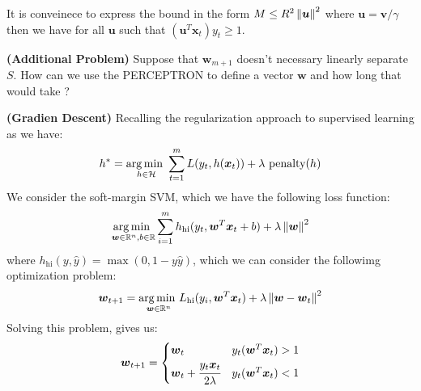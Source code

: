 \begin{remark}
    It is conveinece to express the bound in the form $M \le R^2\left\lVert\boldsymbol u\right\rVert^2$ where $\boldsymbol u = \boldsymbol v/\gamma$ then we have for all $\boldsymbol u$ such that $(\boldsymbol u^T\boldsymbol x_t)y_t\ge1$.     
\end{remark}

\begin{remark}{\textbf{(Additional Problem)}}
    Suppose that $\boldsymbol w_{m+1}$ doesn't necessary linearly separate $S$. How can we use the PERCEPTRON to define a vector $\boldsymbol w$ and how long that would take ? 
\end{remark}

\begin{remark}{\textbf{(Gradien Descent)}}
    Recalling the regularization approach to supervised learning as we have:
    \begin{equation*}
        h^* = \underset{h\in\mathcal{H}}{\arg\min \ } \sum^m_{t=1}L(y_t, h(\boldsymbol x_t)) + \lambda \ \text{penalty}(h)
    \end{equation*}
    We consider the soft-margin SVM, which we have the following loss function:
    \begin{equation*}
        \underset{\boldsymbol w\in \mathbb{R}^n, b\in \mathbb{R}}{\arg\min \ }\sum^m_{i=1}h_\text{hi}(y_t, \boldsymbol w^T\boldsymbol x_t + b) + \lambda\left\lVert\boldsymbol w\right\rVert^2
    \end{equation*}
    where $h_\text{hi}(y, \hat{y}) = \max(0, 1-y\hat{y})$, which we can consider the followimg optimization problem:
    \begin{equation*}
        \boldsymbol w_{t+1} = \underset{\boldsymbol w\in \mathbb{R}^n}{\arg\min \ }L_\text{hi}(y_i, \boldsymbol w^T\boldsymbol x_t) + \lambda\left\lVert\boldsymbol w - \boldsymbol w_t\right\rVert^2
    \end{equation*}
    Solving this problem, gives us:
    \begin{equation*}
        \boldsymbol w_{t+1} = \begin{cases}
            \boldsymbol w_t & y_t(\boldsymbol w^T\boldsymbol x_t) > 1 \\
            \boldsymbol w_t + \cfrac{y_t\boldsymbol x_t}{2\lambda} & y_t(\boldsymbol w^T\boldsymbol x_t) < 1
        \end{cases}
    \end{equation*}
\end{remark}

